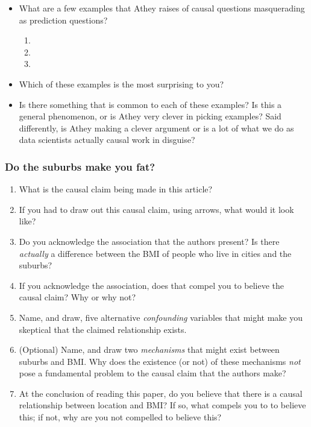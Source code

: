 \documentclass[
]{article}
\providecommand{\tightlist}{%
  \setlength{\itemsep}{0pt}\setlength{\parskip}{0pt}}
\begin{document}
\begin{itemize}
\tightlist
\item
  What are a few examples that Athey raises of causal questions masquerading as prediction questions?

  \begin{enumerate}
  \def\labelenumi{\arabic{enumi}.}
  \tightlist
  \item
  \item
  \item
  \end{enumerate}
\item
  Which of these examples is the most surprising to you?
\item
  Is there something that is common to each of these examples? Is this a general phenomenon, or is Athey very clever in picking examples? Said differently, is Athey making a clever argument or is a lot of what we do as data scientists actually causal work in disguise?
\end{itemize}

\hypertarget{do-the-suburbs-make-you-fat}{%
\subsubsection{Do the suburbs make you fat?}\label{do-the-suburbs-make-you-fat}}

\begin{enumerate}
\def\labelenumi{\arabic{enumi}.}
\tightlist
\item
  What is the causal claim being made in this article?
\item
  If you had to draw out this causal claim, using arrows, what would it look like?
\item
  Do you acknowledge the association that the authors present? Is there \emph{actually} a difference between the BMI of people who live in cities and the suburbs?
\item
  If you acknowledge the association, does that compel you to believe the causal claim? Why or why not?
\item
  Name, and draw, five alternative \emph{confounding} variables that might make you skeptical that the claimed relationship exists.
\item
  (Optional) Name, and draw two \emph{mechanisms} that might exist between suburbs and BMI. Why does the existence (or not) of these mechanisms \emph{not} pose a fundamental problem to the causal claim that the authors make?
\item
  At the conclusion of reading this paper, do you believe that there is a causal relationship between location and BMI? If so, what compels you to to believe this; if not, why are you not compelled to believe this?
\end{enumerate}
\end{document}
